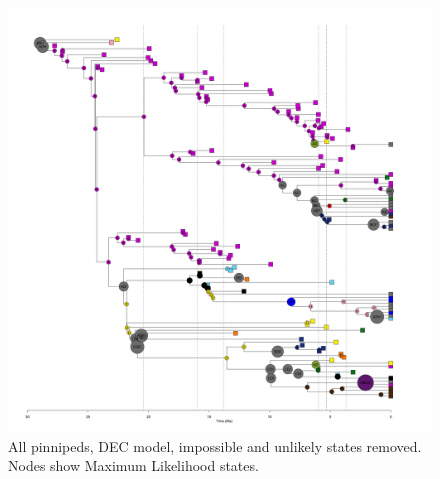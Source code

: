 \documentclass[a4paper, 12pt]{article}
\begin{document}

\begin{figure}[H]
 \centering
  \includegraphics[width = \linewidth]{figures/all-pinnipeds-DEC-unlikely-MLstates.png}
  \caption{All pinnipeds, DEC model, impossible and unlikely states removed. Nodes show Maximum Likelihood states.}
  \label{fig-all-dec-ml-unlikely}
\end{figure} 
\end{document}
